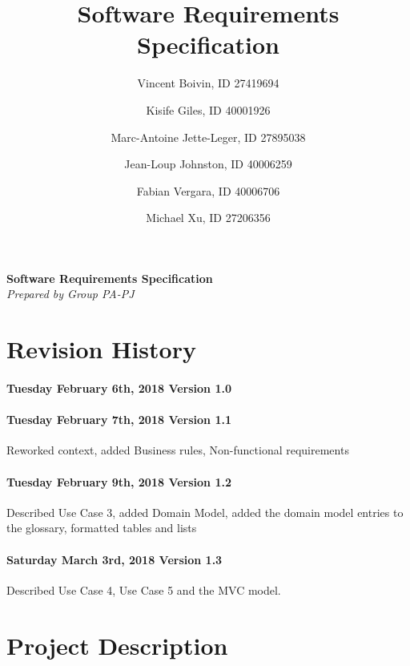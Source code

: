 \documentclass[letterpaper]{article}
\title{Software Requirements Specification}
\author{
	Vincent Boivin, ID 27419694 \and
	Kisife Giles, ID 40001926 \and
	Marc-Antoine Jette-Leger, ID 27895038 \and
	Jean-Loup Johnston, ID 40006259 \and
	Fabian Vergara, ID 40006706 \and
	Michael Xu, ID 27206356
}
\begin{document}
	
\maketitle

   \begin{center}
      \Large\textbf{Software Requirements Specification}\\
      \large\textit{Prepared by Group PA-PJ}\\
   \end{center}
   
   

\newpage

\tableofcontents

\newpage

\section{Revision History}

	\paragraph{Tuesday February 6th, 2018 Version 1.0}  
	
	\paragraph{Tuesday February 7th, 2018 Version 1.1}  
	Reworked context, added Business rules, Non-functional requirements
	
	\paragraph{Tuesday February 9th, 2018 Version 1.2}  
	Described Use Case 3, added Domain Model, added the domain model entries to the glossary, formatted tables and lists
	\paragraph{Saturday March 3rd, 2018 Version 1.3}
	Described Use Case 4, Use Case 5 and the MVC model.
\newpage

\newpage

\section{Project Description}
\end{document}
